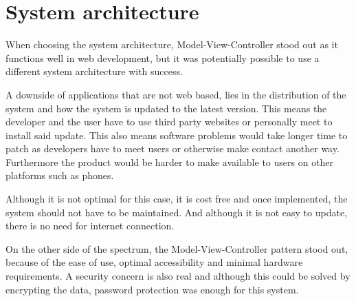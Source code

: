 \section{System architecture}	
When choosing the system architecture, Model-View-Controller stood out as it functions well in web development, but it was potentially possible to use a different system architecture with success.

A downside of applications that are not web based, lies in the distribution of the system and how the system is updated to the latest version. This means the developer and the user have to use third party websites or personally meet to install said update.	
This also means software problems would take longer time to patch as developers have to meet users or otherwise make contact another way.	
Furthermore the product would be harder to make available to users on other platforms such as phones.

Although it is not optimal for this case, it is cost free and once implemented, the system should not have to be maintained.	
And although it is not easy to update, there is no need for internet connection.	

On the other side of the spectrum, the Model-View-Controller pattern stood out, because of the ease of use, optimal accessibility and minimal hardware requirements.
A security concern is also real and although this could be solved by encrypting the data, password protection was enough for this system.